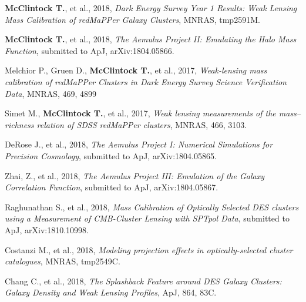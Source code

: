 \documentclass{res}
\begin{document}
\thispagestyle{empty} %

\begin{resume}

{\bf McClintock T.}, et al., 2018, {\it Dark Energy Survey Year 1 Results: Weak Lensing Mass Calibration of redMaPPer Galaxy Clusters}, MNRAS, tmp2591M.

{\bf McClintock T.}, et al., 2018, {\it The Aemulus Project II: Emulating the Halo Mass Function}, submitted to ApJ, arXiv:1804.05866.

Melchior P., Gruen D., {\bf McClintock T.}, et al., 2017, {\it Weak-lensing mass calibration of redMaPPer Clusters in Dark Energy Survey Science Verification Data}, MNRAS, 469, 4899

Simet M., {\bf McClintock T.}, et al., 2017, {\it Weak lensing measurements of the mass--richness relation of SDSS redMaPPer clusters}, MNRAS, 466, 3103.


DeRose J., et al., 2018, {\it The Aemulus Project I: Numerical Simulations for Precision Cosmology}, submitted to ApJ, arXiv:1804.05865.

Zhai, Z., et al., 2018, {\it The Aemulus Project III: Emulation of the Galaxy Correlation Function}, submitted to ApJ, arXiv:1804.05867.

Raghunathan S., et al., 2018, {\it Mass Calibration of Optically Selected DES clusters using a Measurement of CMB-Cluster Lensing with SPTpol Data}, submitted to ApJ, arXiv:1810.10998.

Costanzi M., et al., 2018, {\it Modeling projection effects in optically-selected cluster catalogues}, MNRAS, tmp2549C.

Chang C., et al., 2018, {\it The Splashback Feature around DES Galaxy Clusters: Galaxy Density and Weak Lensing Profiles}, ApJ, 864, 83C.


\end{resume}
\end{document}
